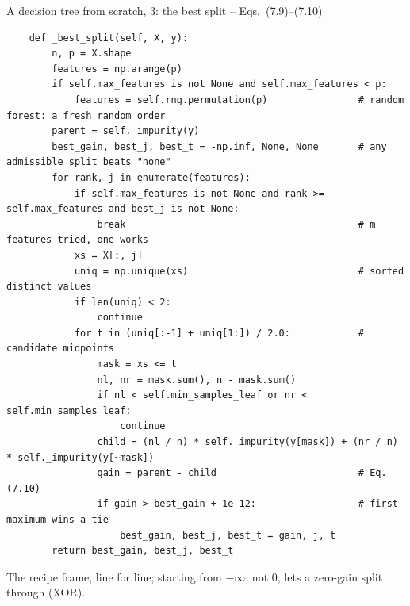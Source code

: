 \documentclass[10pt,aspectratio=169]{beamer}
\begin{document}
\begin{frame}[fragile]{A decision tree from scratch, 3: the best split -- Eqs.\ (7.9)--(7.10)}
\begin{lstlisting}
    def _best_split(self, X, y):
        n, p = X.shape
        features = np.arange(p)
        if self.max_features is not None and self.max_features < p:
            features = self.rng.permutation(p)                # random forest: a fresh random order
        parent = self._impurity(y)
        best_gain, best_j, best_t = -np.inf, None, None       # any admissible split beats "none"
        for rank, j in enumerate(features):
            if self.max_features is not None and rank >= self.max_features and best_j is not None:
                break                                         # m features tried, one works
            xs = X[:, j]
            uniq = np.unique(xs)                              # sorted distinct values
            if len(uniq) < 2:
                continue
            for t in (uniq[:-1] + uniq[1:]) / 2.0:            # candidate midpoints
                mask = xs <= t
                nl, nr = mask.sum(), n - mask.sum()
                if nl < self.min_samples_leaf or nr < self.min_samples_leaf:
                    continue
                child = (nl / n) * self._impurity(y[mask]) + (nr / n) * self._impurity(y[~mask])
                gain = parent - child                         # Eq. (7.10)
                if gain > best_gain + 1e-12:                  # first maximum wins a tie
                    best_gain, best_j, best_t = gain, j, t
        return best_gain, best_j, best_t
\end{lstlisting}
\small The recipe frame, line for line; starting from $-\infty$, not $0$,
lets a zero-gain split through (XOR).
\end{frame}
\end{document}
